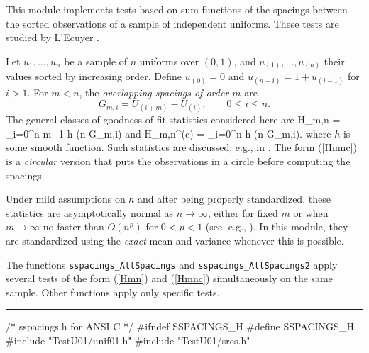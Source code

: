 
This module implements tests based on sum functions of the spacings
between the sorted observations of a sample of independent uniforms.
These tests are studied by L'Ecuyer \cite{rLEC97h}.

Let $u_1,\dots,u_n$ be a sample of $n$ uniforms over $(0,1)$, and
$u_{(1)},\dots, u_{(n)}$ their values sorted by increasing order.
Define $u_{(0)} = 0$ and $u_{(n+i)} = 1 + u_{(i-1)}$ for $i > 1$.
For $m<n$, the {\em overlapping spacings of order $m$\/} are 
 $$ G_{m,i} = U_{(i+m)} - U_{(i)},  \qquad  0\le i\le n. $$
The general classes of goodness-of-fit statistics considered here are 
\eq
   H_{m,n} = \sum_{i=0}^{n-m+1} h (n G_{m,i})               
\endeq
and
\eq
   H_{m,n}^{(c)} = \sum_{i=0}^n h (n G_{m,i}).              
\endeq
where $h$ is some smooth function.
Such statistics are discussed, e.g., in 
\cite{tPYK65a,tKUO81a,tRAO84a,tHAL86a,rLEC97h}.
The form (\ref{Hmnc}) is a {\em circular\/} version that puts the 
observations in a circle before computing the spacings.

Under mild assumptions on $h$ and after being properly standardized,
these statistics are asymptotically normal as $n\to\infty$, 
either for fixed $m$ or when $m\to\infty$ no faster than $O(n^p)$ 
for $0 < p < 1$ (see, e.g., \cite{tDEL79a,tHAL86a,tJAM89a,tKUO81a}).
In this module, they are standardized using the {\em exact\/} mean 
and variance whenever this is possible.

The functions {\tt sspacings\_AllSpacings} and {\tt sspacings\_AllSpacings2}
apply several tests of the form (\ref{Hmn}) and (\ref{Hmnc}) simultaneously
on the same sample. 
Other functions apply only specific tests.

\resdef

\bigskip
\hrule
\code\hide
/* sspacings.h  for ANSI C */
#ifndef SSPACINGS_H
#define SSPACINGS_H
\endhide
#include "TestU01/unif01.h"
#include "TestU01/sres.h"
\endcode

\ifdetailed   %

\code

